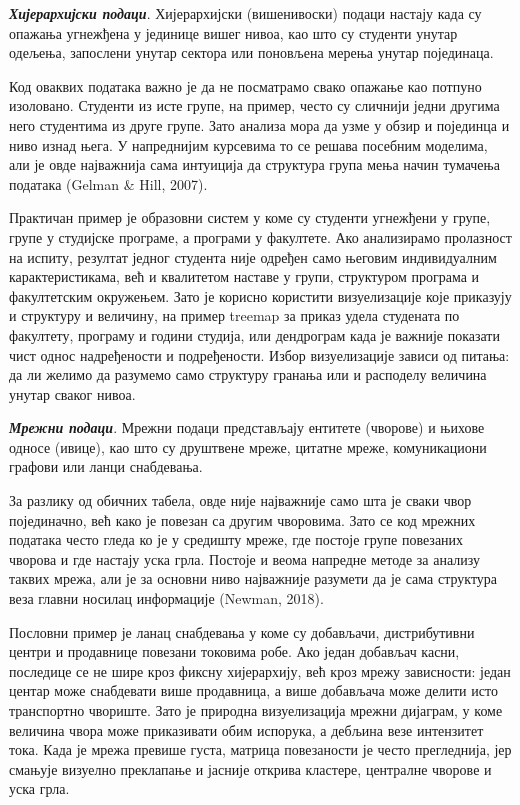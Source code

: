 \textbf{\textit{Хијерархијски подаци}}. Хијерархијски (вишенивоски) подаци настају када су опажања угнежђена у јединице вишег нивоа, као што су студенти унутар одељења, запослени унутар сектора или поновљена мерења унутар појединаца.

Код оваквих података важно је да не посматрамо свако опажање као потпуно изоловано. Студенти из исте групе, на пример, често су сличнији једни другима него студентима из друге групе. Зато анализа мора да узме у обзир и појединца и ниво изнад њега. У напреднијим курсевима то се решава посебним моделима, али је овде најважнија сама интуиција да структура група мења начин тумачења података (Gelman \& Hill, 2007).

Практичан пример је образовни систем у коме су студенти угнежђени у групе, групе у студијске програме, а програми у факултете. Ако анализирамо пролазност на испиту, резултат једног студента није одређен само његовим индивидуалним карактеристикама, већ и квалитетом наставе у групи, структуром програма и факултетским окружењем. Зато је корисно користити визуелизације које приказују и структуру и величину, на пример treemap за приказ удела студената по факултету, програму и години студија, или дендрограм када је важније показати чист однос надређености и подређености. Избор визуелизације зависи од питања: да ли желимо да разумемо само структуру гранања или и расподелу величина унутар сваког нивоа.

\textbf{\textit{Мрежни подаци}}. Мрежни подаци представљају ентитете (чворове) и њихове односе (ивице), као што су друштвене мреже, цитатне мреже, комуникациони графови или ланци снабдевања.

За разлику од обичних табела, овде није најважније само шта је сваки чвор појединачно, већ како је повезан са другим чворовима. Зато се код мрежних података често гледа ко је у средишту мреже, где постоје групе повезаних чворова и где настају уска грла. Постоје и веома напредне методе за анализу таквих мрежа, али је за основни ниво најважније разумети да је сама структура веза главни носилац информације (Newman, 2018).

Пословни пример је ланац снабдевања у коме су добављачи, дистрибутивни центри и продавнице повезани токовима робе. Ако један добављач касни, последице се не шире кроз фиксну хијерархију, већ кроз мрежу зависности: један центар може снабдевати више продавница, а више добављача може делити исто транспортно чвориште. Зато је природна визуелизација мрежни дијаграм, у коме величина чвора може приказивати обим испорука, а дебљина везе интензитет тока. Када је мрежа превише густа, матрица повезаности је често прегледнија, јер смањује визуелно преклапање и јасније открива кластере, централне чворове и уска грла.

